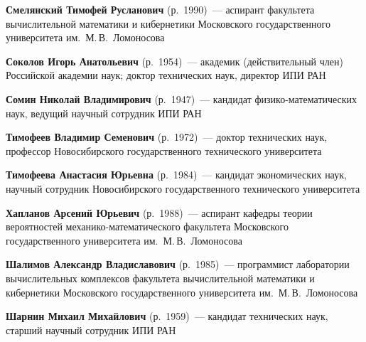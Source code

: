 \begin{multicols}{2}
\def\rightkol{ОБ АВТОРАХ} %

\def\leftkol{ОБ АВТОРАХ} %


\vspace*{4pt}

\noindent
\textbf{Смелянский Тимофей Русланович} (р.\ 1990)~--- аспирант факультета вычислительной 
математики и кибернетики Московского государственного университета им.\ М.\,В.~Ломоносова

\vspace*{4pt}

\noindent
\textbf{Соколов Игорь Анатольевич} (р.\ 1954)~--- академик (действительный член) 
Российской академии наук;  доктор технических наук, директор ИПИ РАН 

\vspace*{4pt}

\noindent
\textbf{Сомин Николай Владимирович} (р.\ 1947)~--- кандидат фи\-зи\-ко-ма\-те\-ма\-ти\-че\-ских 
наук, ведущий научный сотрудник ИПИ РАН 


\vspace*{4pt}


\noindent
\textbf{Тимофеев Владимир Семенович} (р.\ 1972)~--- доктор технических наук, 
профессор Новосибирского государственного технического университета

\vspace*{4pt}

\noindent
\textbf{Тимофеева Анастасия Юрьевна} (р.\ 1984)~--- кандидат экономических наук, 
научный сотрудник  Новосибирского государственного технического университета


\columnbreak


\noindent
\textbf{Хапланов Арсений Юрьевич} (р.\ 1988)~--- 
аспирант кафедры теории вероятностей ме\-ха\-ни\-ко-ма\-те\-ма\-ти\-че\-ско\-го факультета 
Московского государственного университета им.\ М.\,В.~Ломоносова

\vspace*{4pt}

\noindent
\textbf{Шалимов Александр Владиславович} (р.\ 1985)~--- программист лаборатории 
вычислительных комплексов факультета вычислительной математики и кибернетики 
Московского государственного университета им.\ М.\,В.~Ломоносова

\vspace*{4pt}

\noindent
\textbf{Шарнин Михаил Михайлович} (р.\ 1959)~--- кандидат технических наук, 
старший научный сотрудник ИПИ РАН 


\end{multicols}
